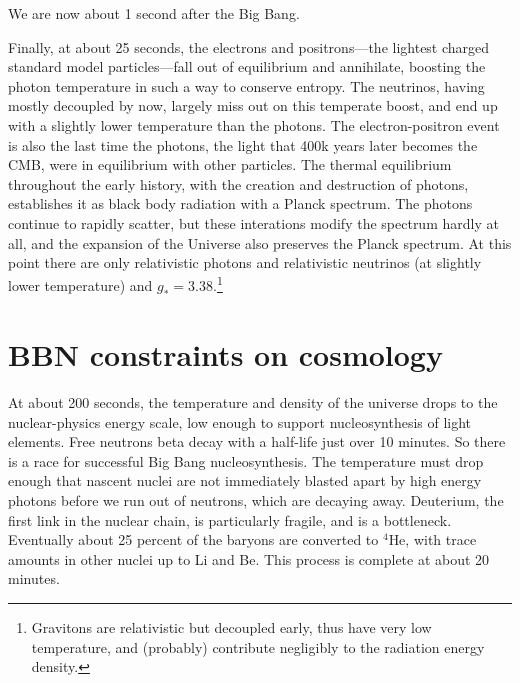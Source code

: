We are now about 1 second after the Big Bang.

Finally, at about 25 seconds, the electrons and positrons---the lightest charged standard model particles---fall out of equilibrium and annihilate, boosting the photon temperature in such a way to conserve entropy.  The neutrinos, having mostly decoupled by now, largely miss out on this temperate boost, and end up with a slightly lower temperature than the photons.  The electron-positron event is also the last time the photons, the light that 400k years later becomes the CMB, were in equilibrium with other particles.  The thermal equilibrium throughout the early history, with the creation and destruction of photons, establishes it as black body radiation with a Planck spectrum.  The photons continue to rapidly scatter, but these interations modify the spectrum hardly at all, and the expansion of the Universe also preserves the Planck spectrum.  {At this point there are only relativistic photons and relativistic neutrinos (at slightly lower temperature) and $g_* = 3.38$.}\footnote{Gravitons are relativistic but decoupled early, thus have very low temperature, and (probably) contribute negligibly to the radiation energy density.}


\section{BBN constraints on cosmology}

At about {200 seconds}, the temperature and density of the universe drops to the nuclear-physics energy scale, low enough to support nucleosynthesis of light elements.  Free neutrons beta decay with a half-life just over {10 minutes}.  So there is a race for successful Big Bang nucleosynthesis.  The temperature must drop enough that nascent nuclei are not immediately blasted apart by high energy photons before we run out of neutrons, which are decaying away. Deuterium, the first link in the nuclear chain, is particularly fragile, and is a bottleneck.  Eventually about 25 percent of the baryons are converted to $^4$He, with trace amounts in other nuclei up to Li and Be.  This process is complete at {about 20 minutes}.

